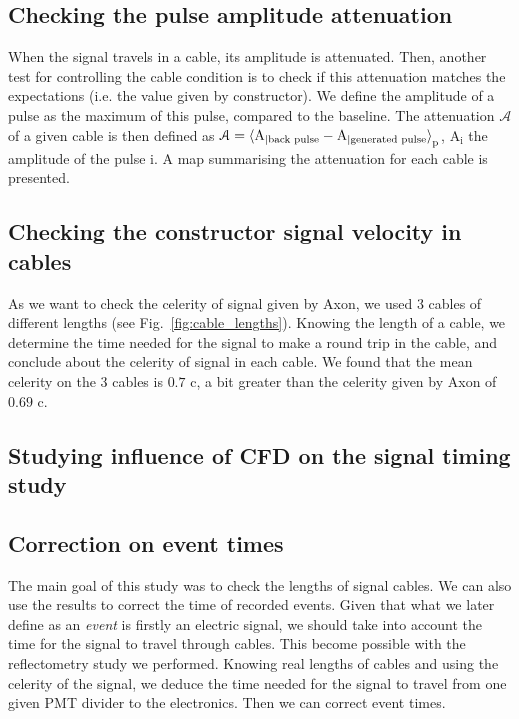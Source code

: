 \subsection*{Checking the pulse amplitude attenuation}
When the signal travels in a cable, its amplitude is attenuated.
Then, another test for controlling the cable condition is to check if this attenuation matches the expectations (i.e. the value given by constructor).
We define the amplitude of a pulse as the maximum of this pulse, compared to the baseline.
The attenuation $\mathcal{A}$ of a given cable is then defined as $\mathcal{A}=\braket{\text{A}_{\vert \text{back pulse}}-\text{A}_{\vert \text{generated pulse}}}_{\text{p}}$, $\text{A}_{\text{i}}$ the amplitude of the pulse i.
A map summarising the attenuation for each cable is presented.

\subsection*{Checking the constructor signal velocity in cables}
\label{subsec:velocity}
As we want to check the celerity of signal given by Axon, we used $3$ cables of different lengths (see Fig.~\ref{fig:cable_lengths}).
Knowing the length of a cable, we determine the time needed for the signal to make a round trip in the cable, and conclude about the celerity of signal in each cable.
We found that the mean celerity on the $3$ cables is $0.7$ c, a bit greater than the celerity given by Axon of $0.69$ c.


\subsection*{Studying influence of CFD on the signal timing study}
\label{subsec:CFD}

\subsection*{Correction on event times}
\label{subsec:time_correction}

The main goal of this study was to check the lengths of signal cables.
We can also use the results to correct the time of recorded events.
Given that what we later define as an \emph{event} is firstly an electric signal, we should take into account the time for the signal to travel through cables.
This become possible with the reflectometry study we performed.
Knowing real lengths of cables and using the celerity of the signal, we deduce the time needed for the signal to travel from one given PMT divider to the electronics.
Then we can correct event times.


